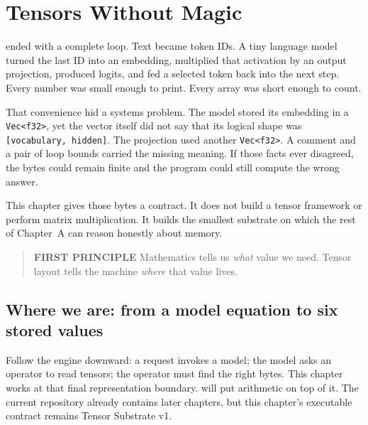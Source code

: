 \chapter{Tensors Without Magic}\label{chapter-5-tensors-without-magic}\label{app:tensors}
 ended with a complete loop. Text became token IDs. A tiny
language model turned the last ID into an embedding, multiplied that
activation by an output projection, produced logits, and fed a selected
token back into the next step. Every number was small enough to print.
Every array was short enough to count.

That convenience hid a systems problem. The model stored its embedding
in a \texttt{Vec\textless{}f32\textgreater{}}, yet the vector itself did
not say that its logical shape was \texttt{{[}vocabulary,\ hidden{]}}.
The projection used another \texttt{Vec\textless{}f32\textgreater{}}. A
comment and a pair of loop bounds carried the missing meaning. If those
facts ever disagreed, the bytes could remain finite and the program
could still compute the wrong answer.

This chapter gives those bytes a contract. It does not build a tensor
framework or perform matrix multiplication. It builds the smallest
substrate on which the rest of Chapter~A can reason honestly about memory.

\begin{quote}
\textbf{FIRST PRINCIPLE} Mathematics tells us \emph{what} value we need.
Tensor layout tells the machine \emph{where} that value lives.
\end{quote}

\section{Where we are: from a model equation to six stored
values}\label{where-we-are-from-a-model-equation-to-six-stored-values}

Follow the engine downward: a request invokes a model; the model asks an
operator to read tensors; the operator must find the right bytes. This
chapter works at that final representation boundary.  will put
arithmetic on top of it. The current repository already contains later
chapters, but this chapter's executable contract remains Tensor
Substrate v1.


